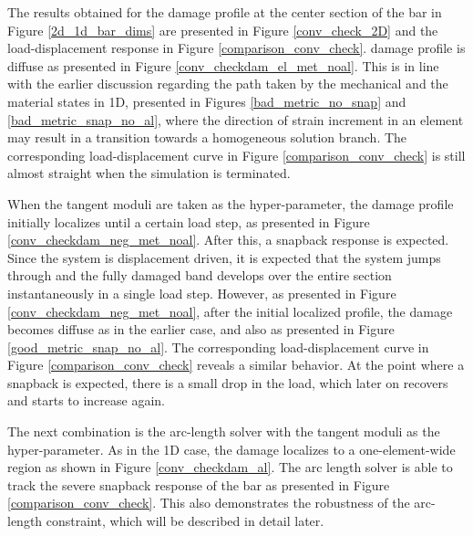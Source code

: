 \documentclass[10pt]{cas-sc}
\begin{document}
The results obtained for the damage profile  at the center section of the bar in Figure \ref{2d_1d_bar_dims}  are presented in Figure \ref{conv_check_2D} and the load-displacement response in Figure \ref{comparison_conv_check}.  damage profile is diffuse as presented in Figure \ref{conv_checkdam_el_met_noal}. This is in line with the earlier discussion regarding the path taken by the mechanical and the material states in 1D, presented in Figures \ref{bad_metric_no_snap} and \ref{bad_metric_snap_no_al}, where the direction of strain increment in an element may result in a transition towards a homogeneous solution branch. The corresponding load-displacement curve in Figure \ref{comparison_conv_check} is still almost straight when the simulation is terminated. 

When the tangent moduli are taken as the hyper-parameter, the damage profile initially localizes until a certain load step, as presented in Figure \ref{conv_checkdam_neg_met_noal}. After this, a snapback response is expected. Since the system is displacement driven, it is expected that the system jumps through and the fully damaged band develops over the entire section instantaneously in a single load step. However, as presented in Figure \ref{conv_checkdam_neg_met_noal}, after the initial localized profile, the damage becomes diffuse as in the earlier case, and also as presented in Figure \ref{good_metric_snap_no_al}. The corresponding load-displacement curve in Figure \ref{comparison_conv_check} reveals a similar behavior. At the point where a snapback is expected, there is a small drop in the load, which later on recovers and starts to increase again. 

The next combination is the arc-length solver with the tangent moduli as the hyper-parameter. As in the 1D case, the damage localizes to a one-element-wide region as shown in Figure \ref{conv_checkdam_al}. The arc length solver is able to track the severe snapback response of the bar as presented in Figure \ref{comparison_conv_check}. This also demonstrates the robustness of the arc-length constraint, which will be described in detail later.
\end{document}
